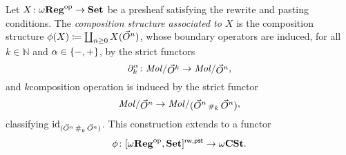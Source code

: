 \begin{dfn}
    Let \( X \colon \omega\mathbf{Reg}^\mathrm{op} \to \mathbf{Set} \) be a presheaf satisfying the rewrite and pasting conditions.
    The \emph{composition structure associated to \( X \)} is the composition structure \( \phi(X) \coloneqq \coprod_{n \geq 0} X(\vec{O}^{n}) \), whose boundary operators are induced, for all \( k \in \mathbb{N} \) and \( \alpha \in \left\{ {- ,+} \right\} \), by the strict functors
    \begin{equation*}
        \bd{k}{\a} \colon \molecin{\dglobe{k}} \to \molecin{\dglobe{n}}, 
    \end{equation*}
    and \( k \)\nbd composition operation is induced by the strict functor
    \begin{equation*}
        \molecin{\dglobe{n}} \to \molecin{(\dglobe{n} \cp{k} \dglobe{n})},
    \end{equation*}
    classifying \( \mathrm{id}_{(\vec{O}^{n} \,{\scriptstyle\#}_{k}\, \vec{O}^{n})} \).
    This construction extends to a functor 
    \begin{equation*}
        \phi \colon [\omega\mathbf{Reg}^\mathrm{op}, \mathbf{Set}]^{\mathsf{rw, pst}} \to \omega\mathbf{CSt}.
    \end{equation*}
\end{dfn}

